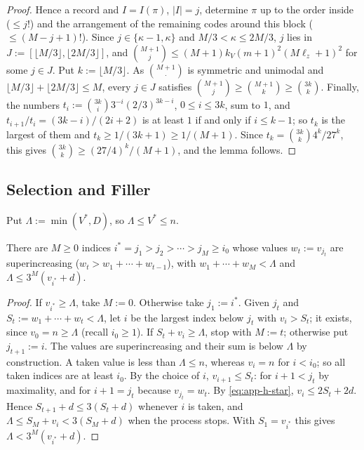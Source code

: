 \begin{proof}
Hence a record and $I=I(\pi)$, $|I|=j$, determine $\pi$ up to the order inside
($\le j!$) and the arrangement of the remaining codes around this block
($\le(M-j+1)!$).  Since $j\in\{\kappa-1,\kappa\}$ and $M/3<\kappa\le2M/3$, $j$
lies in $J:=[\lfloor M/3\rfloor,\lfloor2M/3\rfloor]$, and
$\binom{M+1}{j}\le(M+1)k_V(m+1)^2(M\ell_z+1)^2$ for some $j\in J$.  Put
$k:=\lfloor M/3\rfloor$.  As $\binom{M+1}{\cdot}$ is symmetric and unimodal and
$\lfloor M/3\rfloor+\lfloor2M/3\rfloor\le M$, every $j\in J$ satisfies
$\binom{M+1}{j}\ge\binom{M+1}{k}\ge\binom{3k}{k}$.  Finally, the numbers
$t_i:=\binom{3k}{i}3^{-i}(2/3)^{3k-i}$, $0\le i\le3k$, sum to $1$, and
$t_{i+1}/t_i=(3k-i)/(2i+2)$ is at least $1$ if and only if $i\le k-1$; so $t_k$
is the largest of them and $t_k\ge1/(3k+1)\ge1/(M+1)$.  Since
$t_k=\binom{3k}{k}4^k/27^k$, this gives $\binom{3k}{k}\ge(27/4)^k/(M+1)$, and the
lemma follows.
\end{proof}

\subsection{Selection and Filler}

Put $\Lambda:=\min(V^*,D)$, so $\Lambda\le V^*\le n$.

\begin{lemma}[Selection]
\label{lem:app-h-select}
There are $M\ge0$ indices $i^*=j_1>j_2>\cdots>j_M\ge i_0$ whose values
$w_t:=v_{j_t}$ are superincreasing \textup($w_t>w_1+\cdots+w_{t-1}$\textup), with
$w_1+\cdots+w_M<\Lambda$ and $\Lambda\le3^M(v_{i^*}+d)$.
\end{lemma}

\begin{proof}
If $v_{i^*}\ge\Lambda$, take $M:=0$.  Otherwise take $j_1:=i^*$.  Given
$j_t$ and $S_t:=w_1+\cdots+w_t<\Lambda$, let $i$ be the largest index below $j_t$
with $v_i>S_t$; it exists, since $v_0=n\ge\Lambda$ (recall $i_0\ge1$).  If
$S_t+v_i\ge\Lambda$, stop with $M:=t$; otherwise put $j_{t+1}:=i$.  The values
are superincreasing and their sum is below $\Lambda$ by construction.  A taken
value is less than $\Lambda\le n$, whereas $v_i=n$ for $i<i_0$; so all taken
indices are at least $i_0$.  By the choice of $i$, $v_{i+1}\le S_t$: for
$i+1<j_t$ by maximality, and for $i+1=j_t$ because $v_{j_t}=w_t$.  By
\eqref{eq:app-h-star}, $v_i\le2S_t+2d$.  Hence $S_{t+1}+d\le3(S_t+d)$ whenever $i$
is taken, and $\Lambda\le S_M+v_i<3(S_M+d)$ when the process stops.  With
$S_1=v_{i^*}$ this gives $\Lambda<3^M(v_{i^*}+d)$.
\end{proof}

